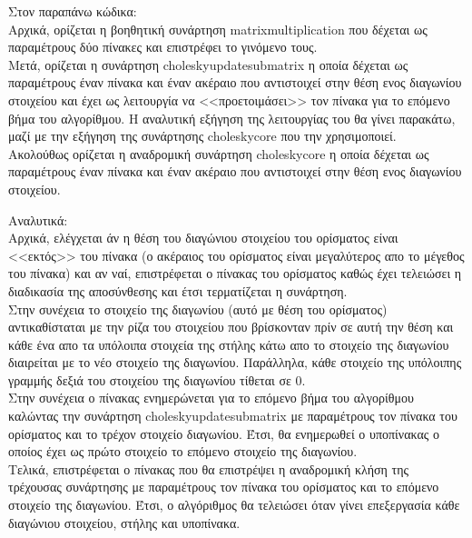\documentclass[a4paper,11pt]{article}
\newcommand{\lt}{\latintext}
\begin{document}
Στον παραπάνω κώδικα:\\
Αρχικά, ορίζεται η βοηθητική συνάρτηση {\lt matrix\textunderscore multiplication} που δέχεται ως παραμέτρους δύο πίνακες και επιστρέφει το γινόμενο τους.\\
Μετά, ορίζεται η συνάρτηση {\lt cholesky\textunderscore update\textunderscore submatrix} η οποία δέχεται ως παραμέτρους έναν πίνακα και έναν ακέραιο που αντιστοιχεί στην θέση ενος διαγωνίου στοιχείου και έχει ως λειτουργία να <<προετοιμάσει>> τον πίνακα για το επόμενο βήμα του αλγορίθμου. Η αναλυτική εξήγηση της λειτουργίας του θα γίνει παρακάτω, μαζί με την εξήγηση της συνάρτησης {\lt cholesky\textunderscore core} που την χρησιμοποιεί.\\
Ακολούθως ορίζεται η αναδρομική συνάρτηση {\lt cholesky\textunderscore core} η οποία δέχεται ως παραμέτρους έναν πίνακα και έναν ακέραιο που αντιστοιχεί στην θέση ενος διαγωνίου στοιχείου.\\
\par
Αναλυτικά:\\
Αρχικά, ελέγχεται άν η θέση του διαγώνιου στοιχείου του ορίσματος είναι <<εκτός>> του πίνακα (ο ακέραιος του ορίσματος είναι μεγαλύτερος απο το μέγεθος του πίνακα) και αν ναί, επιστρέφεται ο πίνακας του ορίσματος καθώς έχει τελειώσει η διαδικασία της αποσύνθεσης  και έτσι τερματίζεται η συνάρτηση.\\
Στην συνέχεια το στοιχείο της διαγωνίου (αυτό με θέση του ορίσματος) αντικαθίσταται με την ρίζα του στοιχείου που βρίσκονταν πρίν σε αυτή την θέση και κάθε ένα απο τα υπόλοιπα στοιχεία της στήλης κάτω απο το στοιχείο της διαγωνίου διαιρείται με το νέο στοιχείο της διαγωνίου. Παράλληλα, κάθε στοιχείο της υπόλοιπης γραμμής δεξιά του στοιχείου της διαγωνίου τίθεται σε 0.\\
Στην συνέχεια ο πίνακας ενημερώνεται για το επόμενο βήμα του αλγορίθμου καλώντας την συνάρτηση {\lt cholesky\textunderscore update\textunderscore submatrix} με παραμέτρους τον πίνακα του ορίσματος και το τρέχον στοιχείο διαγωνίου. Έτσι, θα ενημερωθεί ο υποπίνακας ο οποίος έχει ως πρώτο στοιχείο το επόμενο στοιχείο της διαγωνίου.\\
Τελικά, επιστρέφεται ο πίνακας που θα επιστρέψει η αναδρομική κλήση της τρέχουσας συνάρτησης με παραμέτρους τον πίνακα του ορίσματος και το επόμενο στοιχείο της διαγωνίου. Έτσι, ο αλγόριθμος θα τελειώσει όταν γίνει επεξεργασία κάθε διαγώνιου στοιχείου, στήλης και υποπίνακα.\\
\end{document}
